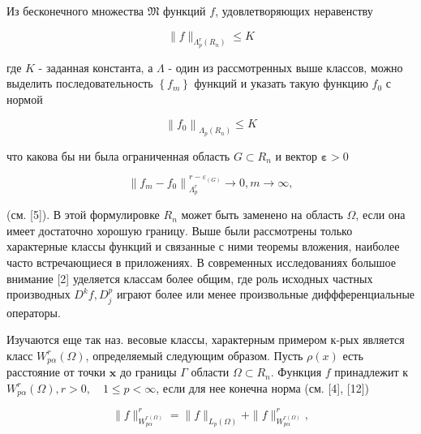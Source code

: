 \documentclass[10pt]{article}
\begin{document}
Из бесконечного множества $\mathfrak{M}$ функций $f$, удовлетворяющих неравенству



\[

\|f\|_{\Lambda_{p}^{r}\left(R_{n}\right)} \leqslant K

\]



где $K$ - заданная константа, а $\Lambda$ - один из рассмотренных выше классов, можно выделить последовательность $\left\{f_{m}\right\}$ функций и указать такую функцию $f_{0}$ с нормой



\[

\left\|f_{0}\right\|_{\Lambda_{p}\left(R_{n}\right)} \leqslant K

\]



что какова бы ни была ограниченная область $G \subset R_{n}$ и вектор $\boldsymbol{\varepsilon}>0$



\[

\left\|f_{m}-f_{0}\right\|_{\Lambda_{p}^{r}}^{r-\varepsilon_{(G)}} \longrightarrow 0, m \longrightarrow \infty,

\]



(см. [5]). В этой формулировке $R_{n}$ может быть заменено на область $\Omega$, если она имеет достаточно хорошую границу. Выше были рассмотрены только характерные классы функций и связанные с ними теоремы вложения, наиболее часто встречающиеся в приложениях. В современных исследованиях болышое внимание [2] уделяется классам более общим, где роль исходных частных производных $D^{k} f, D_{j}^{p}$ играют более или менее произвольные диффференциальные операторы.



Изучаются еще так наз. весовые классы, характерным примером к-рых является класс $W_{p \alpha}^{r}(\Omega)$, определяемый следующим образом. Пусть $\rho(x)$ есть расстояние от точки $\boldsymbol{x}$ до границы $\Gamma$ области $\Omega \subset R_{n}$. Функция $f$ принадлежит к $W_{p \alpha}^{r}(\Omega), r>0, \quad 1 \leqslant p<\infty$, если для нее конечна норма (см. [4], [12])



\[

\|f\|_{W_{p \alpha}^{r(\Omega)}}^{r}=\|f\|_{L_{p}(\Omega)}+\|f\|_{W_{p \alpha}^{r(\Omega)}}^{r},

\]
\end{document}
